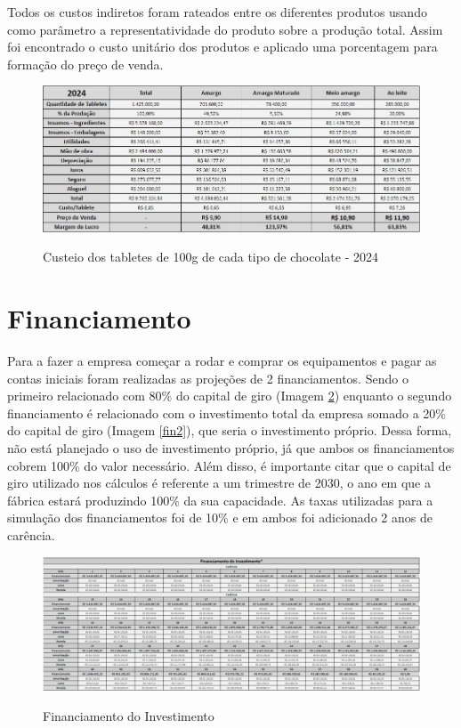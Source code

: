 \documentclass[
	12pt,				%
	openright,			%
	oneside,			%
	a4paper,			%
	english,			%
	french,				%
	spanish,			%
	brazil				%
	]{abntex2}
\begin{document}
Todos os custos indiretos foram rateados entre os diferentes produtos usando como parâmetro a representatividade do produto sobre a produção total. Assim foi encontrado o custo unitário dos produtos e aplicado uma porcentagem para formação do preço de venda. 

\begin{figure}[H]
\begin{center}
\caption{Custeio dos tabletes de 100g de cada tipo de chocolate - 2024}
\includegraphics[scale=0.4]{a2.jpeg} 
\label{-}
\end{center}
\end{figure}

\section{Financiamento}

Para a fazer a empresa começar a rodar e comprar os equipamentos e pagar as contas iniciais foram realizadas as projeções de 2 financiamentos. Sendo o primeiro relacionado com 80$\%$ do capital de giro (Imagem \ref{fin1}) enquanto o segundo financiamento é relacionado com o investimento total da empresa somado a 20$\%$ do capital de giro (Imagem \ref{fin2}), que seria o investimento próprio. Dessa forma, não está planejado o uso de investimento próprio, já que ambos os financiamentos cobrem 100$\%$ do valor necessário. Além disso, é importante citar que o capital de giro utilizado nos cálculos é referente a um trimestre de 2030, o ano em que a fábrica estará produzindo 100$\%$ da sua capacidade. As taxas utilizadas para a simulação dos financiamentos foi de 10$\%$ e em ambos foi adicionado 2 anos de carência.

\begin{landscape}

\begin{figure}[]
\begin{center}
\caption{Financiamento do Investimento}
\includegraphics[scale=0.5]{a3.jpeg} 
\label{fin1}
\end{center}
\end{figure}

\end{landscape}
\end{document}
